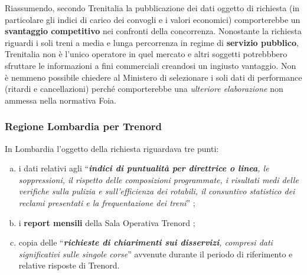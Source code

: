 \documentclass[12pt,italian]{report}
\begin{document}
Riassumendo, secondo Trenitalia la pubblicazione dei dati oggetto di
richiesta (in particolare gli indici di carico dei convogli e i valori
economici) comporterebbe un \textbf{svantaggio competitivo} nei
confronti della concorrenza.  Nonostante la richiesta riguardi i soli
treni a media e lunga percorrenza in regime di \textbf{servizio
    pubblico}, Trenitalia non è l'unico operatore in quel mercato e
altri soggetti potrebbbero sfruttare le informazioni a fini
commerciali creandosi un ingiusto vantaggio.  Non è nemmeno possibile
chiedere al Ministero di selezionare i soli dati di performance
(ritardi e cancellazioni) perché comporterebbe una \textit{ulteriore
    elaborazione} non ammessa nella normativa Foia.

\subsubsection{Regione Lombardia per Trenord}

In Lombardia l'oggetto della richiesta riguardava tre punti:
\begin{enumerate}[a)]
    \item i dati relativi agli ``\textit{\textbf{indici di puntualità
            per direttrice o linea}, le soppressioni, il rispetto
        delle composizioni programmate, i risultati medi delle
        verifiche sulla pulizia e sull'efficienza dei rotabili, il
        consuntivo statistico dei reclami presentati e la
        frequentazione dei treni}'' \cite[allegato 11]{LombardiaDati};
    \item i \textbf{report mensili} della Sala Operativa Trenord
    \cite[art.\@ 31, paragrafo 3]{LombardiaDati};
    \item copia delle ``\textit{\textbf{richieste di chiarimenti sui
            disservizi}, compresi dati significativi sulle singole
        corse}'' \cite[art.\@ 32, paragrafo 6]{LombardiaDati} avvenute
    durante il periodo di riferimento e relative risposte di Trenord.
\end{enumerate}
\end{document}
